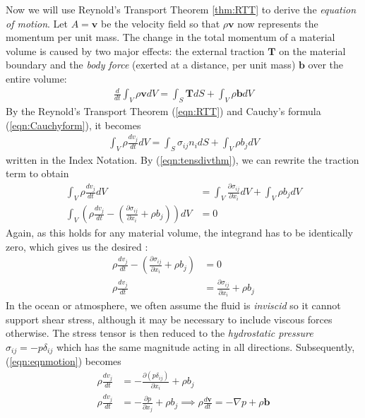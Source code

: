 Now we will use Reynold's Transport Theorem \ref{thm:RTT} to derive the \textit{equation of motion}. Let $A = \textbf{v}$ be the velocity field so that $\rho \textbf{v}$ now represents the momentum per unit mass. The change in the total momentum of a material volume is caused by two major effects: the external traction $\textbf{T}$ on the material boundary and the \textit{body force} (exerted at a distance, per unit mass) $\textbf{b}$ over the entire volume:
\begin{align}
\frac{d}{dt} \int_V \rho \textbf{v} dV = \int_S \textbf{T} dS + \int_V \rho\textbf{b} dV
\end{align}
By the Reynold's Transport Theorem (\ref{eqn:RTT}) and Cauchy's formula (\ref{eqn:Cauchyform}), it becomes
\begin{align}
\int_V \rho \frac{dv_j}{dt} dV = \int_S \sigma_{ij}n_i dS + \int_V \rho b_j dV   
\end{align}
written in the Index Notation. By (\ref{eqn:tensdivthm}), we can rewrite the traction term to obtain
\begin{align}
\int_V \rho \frac{dv_j}{dt} dV &= \int_V \frac{\partial\sigma_{ij}}{\partial x_i} dV + \int_V \rho b_j dV \nonumber \\
\int_V (\rho \frac{dv_j}{dt} - (\frac{\partial\sigma_{ij}}{\partial x_i}+\rho b_j))dV &= 0
\end{align}
Again, as this holds for any material volume, the integrand has to be identically zero, which gives us the desired :
\begin{align}
\rho \frac{dv_j}{dt} - (\frac{\partial\sigma_{ij}}{\partial x_i}+\rho b_j) &= 0 \nonumber \\
\rho \frac{dv_j}{dt} &= \frac{\partial\sigma_{ij}}{\partial x_i}+\rho b_j \label{eqn:eqnmotion}
\end{align}
In the ocean or atmosphere, we often assume the fluid is \textit{inviscid} so it cannot support shear stress, although it may be necessary to include viscous forces otherwise. The stress tensor is then reduced to the \textit{hydrostatic pressure} $\sigma_{ij} = -p\delta_{ij}$ which has the same magnitude acting in all directions. Subsequently, (\ref{eqn:eqnmotion}) becomes
\begin{align}
\rho \frac{dv_j}{dt} &= -\frac{\partial (p\delta_{ij})}{\partial x_i} + \rho b_j \nonumber \\
\rho \frac{dv_j}{dt} &= -\frac{\partial p}{\partial x_j} + \rho b_j \implies \rho\frac{d\textbf{v}}{dt} = -\nabla p + \rho \textbf{b} \label{eqn:eqnmotion2}
\end{align}
